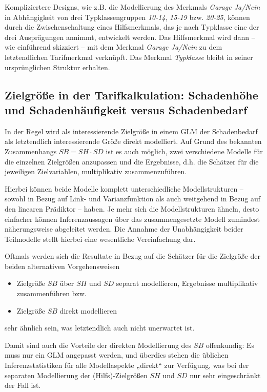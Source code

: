 Kompliziertere Designs, wie z.B. die Modellierung des Merkmals \textit{Garage Ja/Nein} in Abhängigkeit von drei Typklassengruppen \textit{10-14}, \textit{15-19} bzw. \textit{20-25}, können durch die Zwischenschaltung eines Hilfsmerkmals, das je nach Typklasse eine der drei Ausprägungen annimmt, entwickelt werden. Das Hilfsmerkmal wird dann – wie einführend skizziert – mit dem Merkmal \textit{Garage Ja/Nein} zu dem letztendlichen Tarifmerkmal verknüpft. Das Merkmal \textit{Typklasse} bleibt in seiner ursprünglichen Struktur erhalten.

\subsection{Zielgröße in der Tarifkalkulation: Schadenhöhe und Schadenhäufigkeit versus Schadenbedarf}

In der Regel wird als interessierende Zielgröße in einem GLM der Schadenbedarf als letztendlich interessierende Größe direkt modelliert. Auf Grund des bekannten Zusammenhangs $SB=SH \cdot SD$ ist es auch möglich, zwei verschiedene Modelle für die einzelnen Zielgrößen anzupassen und die Ergebnisse, d.h. die Schätzer für die jeweiligen Zielvariablen, multiplikativ zusammenzuführen. 

Hierbei können beide Modelle komplett unterschiedliche Modellstrukturen – sowohl in Bezug auf Link- und Varianzfunktion als auch weitgehend in Bezug auf den linearen Prädiktor – haben. Je mehr sich die Modellstrukturen ähneln, desto einfacher können Inferenzaussagen über das zusammengesetzte Modell zumindest näherungsweise abgeleitet werden. Die Annahme der Unabhängigkeit beider Teilmodelle stellt hierbei eine wesentliche Vereinfachung dar. 

Oftmals werden sich die Resultate in Bezug auf die Schätzer für die Zielgröße der beiden alternativen Vorgehensweisen
\begin{itemize}
\item Zielgröße $SB$  über $SH$  und $SD$ separat modellieren, Ergebnisse multiplikativ zusammenführen bzw.
\item Zielgröße $SB$   direkt modellieren
\end{itemize}
sehr ähnlich sein, was letztendlich auch nicht unerwartet ist.

Damit sind auch die Vorteile der direkten Modellierung des $SB$  offenkundig: Es muss nur ein GLM angepasst werden, und überdies stehen die üblichen Inferenzstatistiken für alle Modellaspekte „direkt“ zur Verfügung, was bei der separaten Modellierung der (Hilfs)-Zielgrößen $SH$  und  $SD$ nur sehr eingeschränkt der Fall ist.


